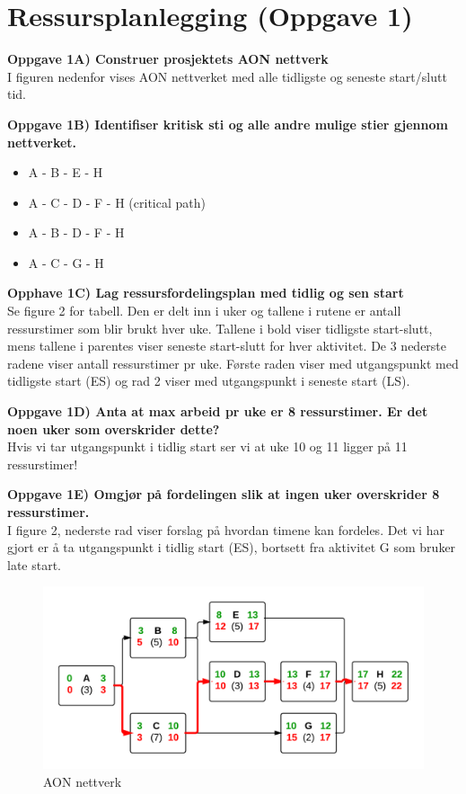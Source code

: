 \section{Ressursplanlegging (Oppgave 1)}
	
	{\bf Oppgave 1A) Construer prosjektets AON nettverk} \\
	I figuren nedenfor vises AON nettverket med alle tidligste og seneste start/slutt tid.

	{\bf Oppgave 1B) Identifiser kritisk sti og alle andre mulige stier gjennom nettverket.} \\

	\begin{itemize}
		\item A - B - E - H 
		\item {\color{red} A - C - D - F - H (critical path)}
		\item A - B - D - F - H 
		\item A - C - G - H 
	\end{itemize}

	{\bf Opphave 1C) Lag ressursfordelingsplan med tidlig og sen start} \\

		Se figure 2  for tabell. Den er delt inn i uker og tallene i rutene er
		antall ressurstimer som blir brukt hver uke. Tallene i bold viser 
		tidligste start-slutt, mens tallene i parentes viser seneste start-slutt for
		hver aktivitet.
		De 3 nederste radene viser antall ressurstimer pr uke. 
		Første raden viser med utgangspunkt med tidligste start (ES) og rad 2 viser
		med utgangspunkt i seneste start (LS).

	{\bf Oppgave 1D) Anta at max arbeid pr uke er 8 ressurstimer. Er det noen uker som overskrider dette?} \\

		Hvis vi tar utgangspunkt i tidlig start ser vi at uke 10 og 11 ligger på 11 ressurstimer!


	{\bf Oppgave 1E) Omgjør på fordelingen slik at ingen uker overskrider 8 ressurstimer.} \\

		I figure 2, nederste rad viser forslag på hvordan timene kan fordeles. Det vi har gjort
		er å ta utgangspunkt i tidlig start (ES), bortsett fra aktivitet G som bruker late start.


	\begin{figure}[H]
		\centering
		\includegraphics[scale=0.3, angle=90]{task2.png}
		\caption{AON nettverk}
	\end{figure}

